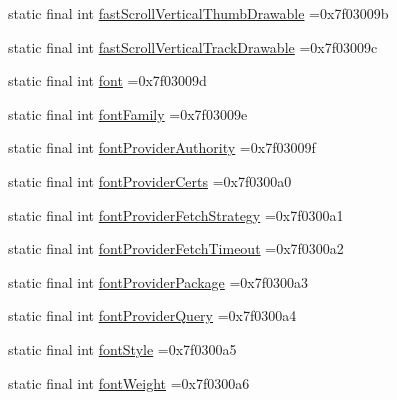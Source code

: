 \begin{DoxyCompactItemize}
\item 
static final int \mbox{\hyperlink{classbr_1_1unb_1_1cic_1_1mp_1_1marketmaster_1_1test_1_1R_1_1attr_a3d06f5c9830b021907e28bd0496bc9c6}{fast\+Scroll\+Vertical\+Thumb\+Drawable}} =0x7f03009b
\item 
static final int \mbox{\hyperlink{classbr_1_1unb_1_1cic_1_1mp_1_1marketmaster_1_1test_1_1R_1_1attr_ab707d23b5a074673681fa1890c4c586b}{fast\+Scroll\+Vertical\+Track\+Drawable}} =0x7f03009c
\item 
static final int \mbox{\hyperlink{classbr_1_1unb_1_1cic_1_1mp_1_1marketmaster_1_1test_1_1R_1_1attr_a9ebbe51a93e32122b6a8feceabdda7b8}{font}} =0x7f03009d
\item 
static final int \mbox{\hyperlink{classbr_1_1unb_1_1cic_1_1mp_1_1marketmaster_1_1test_1_1R_1_1attr_ab158b56a4c6a5fdf1c6fc66ab06742cd}{font\+Family}} =0x7f03009e
\item 
static final int \mbox{\hyperlink{classbr_1_1unb_1_1cic_1_1mp_1_1marketmaster_1_1test_1_1R_1_1attr_a6f9d7db4f81708a7b85734344f20b506}{font\+Provider\+Authority}} =0x7f03009f
\item 
static final int \mbox{\hyperlink{classbr_1_1unb_1_1cic_1_1mp_1_1marketmaster_1_1test_1_1R_1_1attr_a1ca787cae835551ff4e0d98693f881e3}{font\+Provider\+Certs}} =0x7f0300a0
\item 
static final int \mbox{\hyperlink{classbr_1_1unb_1_1cic_1_1mp_1_1marketmaster_1_1test_1_1R_1_1attr_aa1b2de1f82c82c1e2f8b19d0af5064e5}{font\+Provider\+Fetch\+Strategy}} =0x7f0300a1
\item 
static final int \mbox{\hyperlink{classbr_1_1unb_1_1cic_1_1mp_1_1marketmaster_1_1test_1_1R_1_1attr_a1fe0ec8fe177a884adbae4f0bb1a5783}{font\+Provider\+Fetch\+Timeout}} =0x7f0300a2
\item 
static final int \mbox{\hyperlink{classbr_1_1unb_1_1cic_1_1mp_1_1marketmaster_1_1test_1_1R_1_1attr_abb3709fa93d4f8e80398ed8dd070e590}{font\+Provider\+Package}} =0x7f0300a3
\item 
static final int \mbox{\hyperlink{classbr_1_1unb_1_1cic_1_1mp_1_1marketmaster_1_1test_1_1R_1_1attr_a61ed2d774ecddc2e4039e3f461805740}{font\+Provider\+Query}} =0x7f0300a4
\item 
static final int \mbox{\hyperlink{classbr_1_1unb_1_1cic_1_1mp_1_1marketmaster_1_1test_1_1R_1_1attr_a3ddd565be2b965f6cf7cb29e286a1b4a}{font\+Style}} =0x7f0300a5
\item 
static final int \mbox{\hyperlink{classbr_1_1unb_1_1cic_1_1mp_1_1marketmaster_1_1test_1_1R_1_1attr_ad045df6eb293b31890603cec6793a8be}{font\+Weight}} =0x7f0300a6

\end{DoxyCompactItemize}
